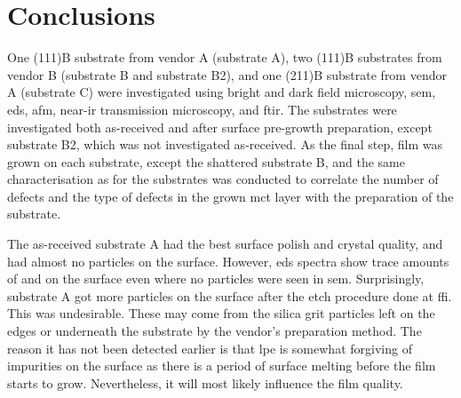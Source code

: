 \chapter{Conclusions}\label{ch:conclusion}

One (111)B substrate from vendor A (substrate A), two (111)B substrates from vendor B (substrate B and substrate B2), and one (211)B substrate from vendor A (substrate C) were investigated using bright and dark field microscopy, \ac{sem}, \ac{eds}, \ac{afm}, near-\ac{ir} transmission microscopy, and \ac{ftir}. The substrates were investigated both as-received and after surface pre-growth preparation, except substrate B2, which was not investigated as-received. As the final step,  film was grown on each substrate, except the shattered substrate B, and the same characterisation as for the substrates was conducted to correlate the number of defects and the type of defects in the grown \ac{mct} layer with the preparation of the substrate.

The as-received substrate A had the best surface polish and crystal quality, and had almost no particles on the surface. However, \ac{eds} spectra show trace amounts of  and  on the surface even where no particles were seen in \ac{sem}. Surprisingly, substrate A got more particles on the surface after the etch procedure done at \ac{ffi}. This was undesirable. These may come from the silica grit particles left on the edges or underneath the substrate by the vendor's preparation method. The reason it has not been detected earlier is that \ac{lpe} is somewhat forgiving of impurities on the surface as there is a period of surface melting before the film starts to grow. Nevertheless, it will most likely influence the film quality.

